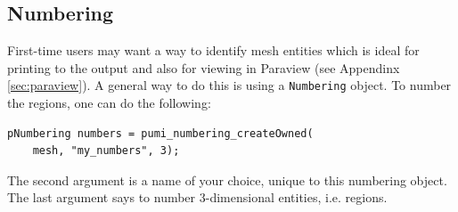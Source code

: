 \documentclass{article}
\begin{document}
\subsection{Numbering}
\label{sec:num}

First-time users may want a way to identify mesh entities which
is ideal for printing to the output and also for viewing in
Paraview (see Appendinx \ref{sec:paraview}).
A general way to do this is using a \texttt{Numbering} object.
To number the regions, one can do the following:

\begin{lstlisting}
pNumbering numbers = pumi_numbering_createOwned(
    mesh, "my_numbers", 3);
\end{lstlisting}

The second argument is a name of your choice, unique to this numbering object.
The last argument says to number 3-dimensional entities, i.e. regions.
\end{document}
